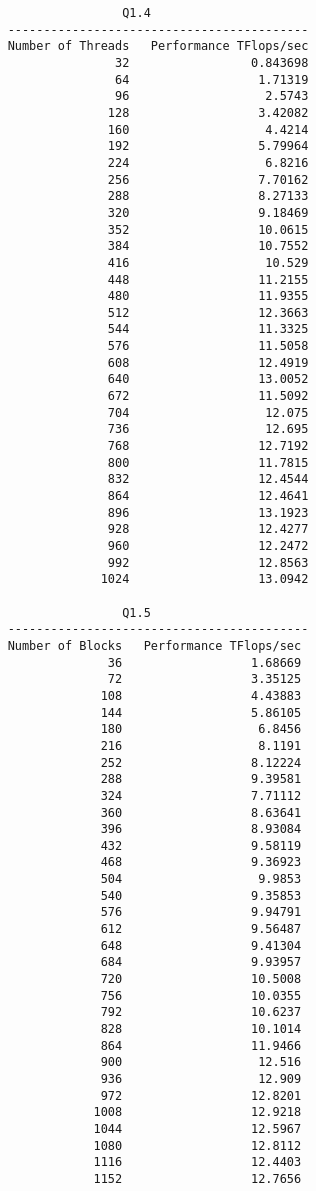\documentclass[12pt,letterpaper,twoside]{article}
\begin{document}
\begin{itemize}
\begin{verbatim}
                    Q1.4
    ------------------------------------------ 
    Number of Threads   Performance TFlops/sec
                   32                 0.843698
                   64                  1.71319
                   96                   2.5743
                  128                  3.42082
                  160                   4.4214
                  192                  5.79964
                  224                   6.8216
                  256                  7.70162
                  288                  8.27133
                  320                  9.18469
                  352                  10.0615
                  384                  10.7552
                  416                   10.529
                  448                  11.2155
                  480                  11.9355
                  512                  12.3663
                  544                  11.3325
                  576                  11.5058
                  608                  12.4919
                  640                  13.0052
                  672                  11.5092
                  704                   12.075
                  736                   12.695
                  768                  12.7192
                  800                  11.7815
                  832                  12.4544
                  864                  12.4641
                  896                  13.1923
                  928                  12.4277
                  960                  12.2472
                  992                  12.8563
                 1024                  13.0942

                    Q1.5
    ------------------------------------------ 
    Number of Blocks   Performance TFlops/sec
                  36                  1.68669
                  72                  3.35125
                 108                  4.43883
                 144                  5.86105
                 180                   6.8456
                 216                   8.1191
                 252                  8.12224
                 288                  9.39581
                 324                  7.71112
                 360                  8.63641
                 396                  8.93084
                 432                  9.58119
                 468                  9.36923
                 504                   9.9853
                 540                  9.35853
                 576                  9.94791
                 612                  9.56487
                 648                  9.41304
                 684                  9.93957
                 720                  10.5008
                 756                  10.0355
                 792                  10.6237
                 828                  10.1014
                 864                  11.9466
                 900                   12.516
                 936                   12.909
                 972                  12.8201
                1008                  12.9218
                1044                  12.5967
                1080                  12.8112
                1116                  12.4403
                1152                  12.7656


\end{verbatim}
\end{itemize}
\end{document}

